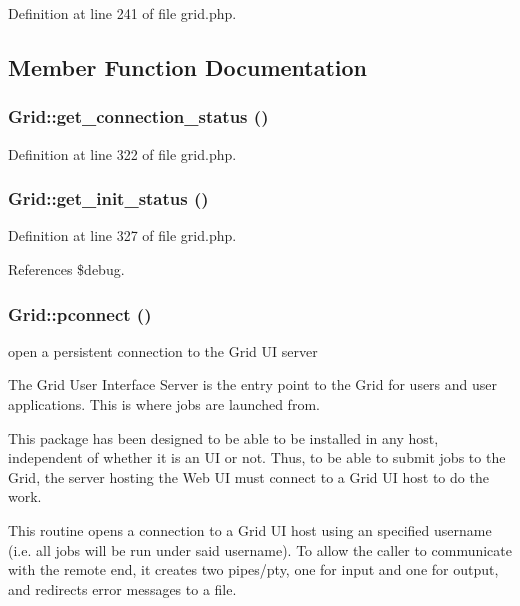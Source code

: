 Definition at line 241 of file grid.php.

\subsection{Member Function Documentation}
\subsubsection{\setlength{\rightskip}{0pt plus 5cm}Grid::get\_\-connection\_\-status ()}\label{classGrid_a7}




Definition at line 322 of file grid.php.
\subsubsection{\setlength{\rightskip}{0pt plus 5cm}Grid::get\_\-init\_\-status ()}\label{classGrid_a8}




Definition at line 327 of file grid.php.

References \$debug.
\subsubsection{\setlength{\rightskip}{0pt plus 5cm}Grid::pconnect ()}\label{classGrid_a9}


open a persistent connection to the Grid UI server 

The Grid User Interface Server is the entry point to the Grid for users and user applications. This is where jobs are launched from.

This package has been designed to be able to be installed in any host, independent of whether it is an UI or not. Thus, to be able to submit jobs to the Grid, the server hosting the Web UI must connect to a Grid UI host to do the work.

This routine opens a connection to a Grid UI host using an specified username (i.e. all jobs will be run under said username). To allow the caller to communicate with the remote end, it creates two pipes/pty, one for input and one for output, and redirects error messages to a file.

